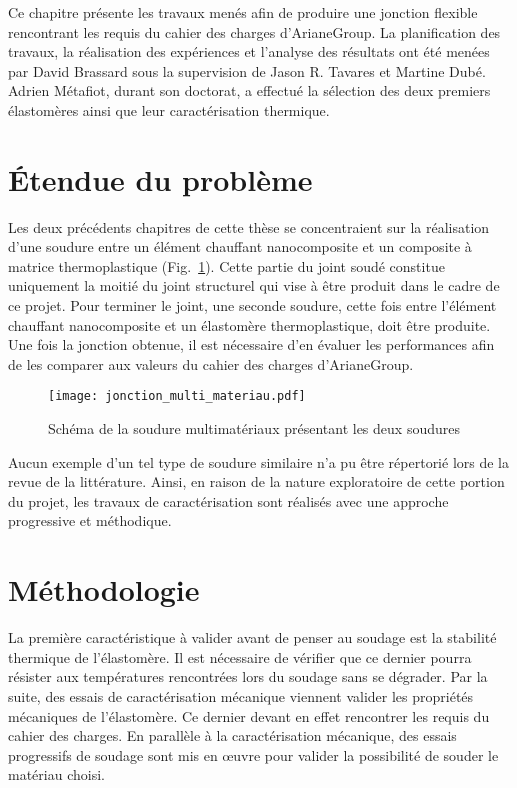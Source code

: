 \label{sec:Theme3}

Ce chapitre présente les travaux menés afin de produire une jonction flexible rencontrant les requis du cahier des charges d'ArianeGroup. 
La planification des travaux, la réalisation des expériences et l'analyse des résultats ont été menées par David Brassard sous la supervision de Jason R. Tavares et Martine Dubé. 
Adrien Métafiot, durant son doctorat, a effectué la sélection des deux premiers élastomères ainsi que leur caractérisation thermique. 

\section{Étendue du problème}

Les deux précédents chapitres de cette thèse se concentraient sur la réalisation d'une soudure entre un élément chauffant nanocomposite et un composite à matrice thermoplastique \mbox{(Fig. \ref{fig:scema_double_jonction})}. 
Cette partie du joint soudé constitue uniquement la moitié du joint structurel qui vise à être produit dans le cadre de ce projet. 
Pour terminer le joint, une seconde soudure, cette fois entre l'élément chauffant nanocomposite et un élastomère thermoplastique, doit être produite. 
Une fois la jonction obtenue, il est nécessaire d'en évaluer les performances afin de les comparer aux valeurs du cahier des charges d'ArianeGroup. 

\begin{figure}[h]
	\centering
	\texttt{[image: jonction\_multi\_materiau.pdf]}
	\caption{Schéma de la soudure multimatériaux présentant les deux soudures}
	\label{fig:scema_double_jonction}
\end{figure}

Aucun exemple d'un tel type de soudure similaire n'a pu être répertorié lors de la revue de la littérature. 
Ainsi, en raison de la nature exploratoire de cette portion du projet, les travaux de caractérisation sont réalisés avec une approche progressive et méthodique. 

\section{Méthodologie}

La première caractéristique à valider avant de penser au soudage est la stabilité thermique de l'élastomère. 
Il est nécessaire de vérifier que ce dernier pourra résister aux températures rencontrées lors du soudage sans se dégrader. 
Par la suite, des essais de caractérisation mécanique viennent valider les propriétés mécaniques de l'élastomère.
Ce dernier devant en effet rencontrer les requis du cahier des charges. 
En parallèle à la caractérisation mécanique, des essais progressifs de soudage sont mis en œuvre pour valider la possibilité de souder le matériau choisi. 

